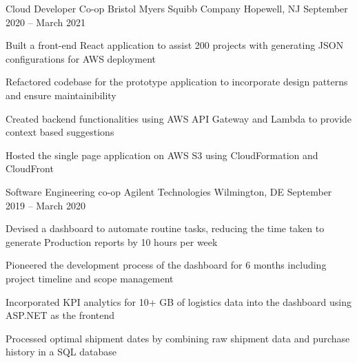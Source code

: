 \begin{cventries}
	\vspace{-2mm}
	\cventry
	{Cloud Developer Co-op}
	{Bristol Myers Squibb Company}
	{Hopewell, NJ}
	{September 2020 – March 2021}
	{\begin{cvitems}
        \item {Built a front-end React application to assist 200 projects with generating JSON configurations for AWS deployment}
        \item {Refactored codebase for the prototype application to incorporate design patterns and ensure maintainibility}
        \item {Created backend functionalities using AWS API Gateway and Lambda to provide context based suggestions}
        \item {Hosted the single page application on AWS S3 using CloudFormation and CloudFront}
		\end{cvitems}}
	
	\vspace{-2mm}
	\cventry
	{Software Engineering co-op}
	{Agilent Technologies}
	{Wilmington, DE}
	{September 2019 – March 2020}
	{\begin{cvitems}
	    \item {Devised a dashboard to automate routine tasks, reducing the time taken to generate Production reports by 10 hours per week}
        \item {Pioneered the development process of the dashboard for 6 months including project timeline and scope management}
		\item {Incorporated KPI analytics for 10+ GB of logistics data into the dashboard using ASP.NET as the frontend}
        \item {Processed optimal shipment dates by combining raw shipment data and purchase history in a SQL database}
		\end{cvitems}}
	

\end{cventries}
